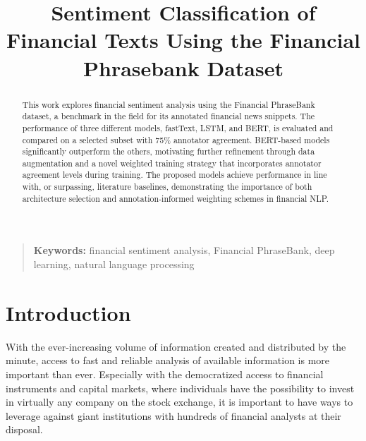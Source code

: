 \documentclass[conference]{IEEEtran}
\begin{document}
\title{Sentiment Classification of Financial Texts Using the Financial Phrasebank Dataset}

\author{
\and
{}
}

\maketitle
\thispagestyle{plain}

\begin{abstract}
This work explores financial sentiment analysis using the Financial PhraseBank dataset, a benchmark in the field for its annotated financial news snippets. The performance of three different models, fastText, LSTM, and BERT, is evaluated and compared on a selected subset with 75\% annotator agreement. BERT-based models significantly outperform the others, motivating further refinement through data augmentation and a novel weighted training strategy that incorporates annotator agreement levels during training. The proposed models achieve performance in line with, or surpassing, literature baselines, demonstrating the importance of both architecture selection and annotation-informed weighting schemes in financial NLP.
\end{abstract}

\begin{quote}
\small
\noindent
\textbf{Keywords:}  financial sentiment analysis, Financial PhraseBank, deep learning, natural language processing
\end{quote}

\IEEEpeerreviewmaketitle


\section{Introduction}

With the ever-increasing volume of information created and distributed by the minute, access to fast and reliable analysis of available information is more important than ever. Especially with the democratized access to financial instruments and capital markets, where individuals have the possibility to invest in virtually any company on the stock exchange, it is important to have ways to leverage against giant institutions with hundreds of financial analysts at their disposal. 
\end{document}
